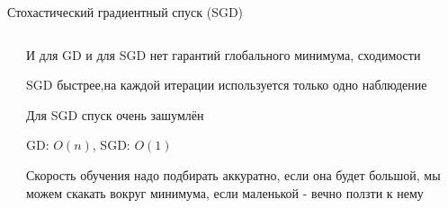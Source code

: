 \documentclass[notes,12pt, aspectratio=169]{beamer}
\newenvironment{wideitemize}{\itemize\addtolength{\itemsep}{10pt}}{\enditemize}
\begin{document}
\begin{frame}{Стохастический градиентный спуск (SGD)}
\begin{columns}[T] %
	\begin{column}{.4\textwidth}
	\end{column}%
	\hfill%
	\begin{column}{.6\textwidth}
		\begin{wideitemize}
			\item И для GD и для SGD нет гарантий глобального минимума, сходимости
			\item SGD быстрее,на каждой итерации используется только одно наблюдение
			\item Для SGD спуск очень зашумлён 
			\item  GD: $O(n)$, SGD: $O(1)$
			\item Скорость обучения надо подбирать аккуратно, если она будет большой, мы можем скакать вокруг минимума, если маленькой - вечно ползти к нему
		\end{wideitemize}
	\end{column}%
\end{columns}
\end{frame}
\end{document}
